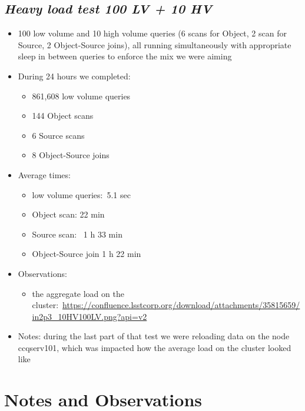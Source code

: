 \documentclass[DM,toc]{lsstdoc}
\begin{document}
\subsection{\texorpdfstring{\textbf{\emph{Heavy load test 100 LV + 10
HV}}}{Heavy load test 100 LV + 10 HV}}\label{heavy-load-test-100-lv-10-hv}

\begin{itemize}
\item
  100 low volume and 10 high volume queries (6 scans for Object, 2 scan
  for Source, 2 Object-Source joins), all running simultaneously with
  appropriate sleep in between queries to enforce the mix we were aiming
\item
  During 24 hours we completed:

  \begin{itemize}
  \item
    861,608 low volume queries
  \item
    144 Object scans
  \item
    6 Source scans
  \item
    8 Object-Source joins
  \end{itemize}
\item
  Average times:

  \begin{itemize}
  \item
    low volume queries:~5.1 sec
  \item
    Object scan: 22 min
  \item
    Source scan: ~1 h 33 min
  \item
    Object-Source join 1 h 22 min
  \end{itemize}
\item
  Observations:

  \begin{itemize}
  \item
    the aggregate load on the
    cluster:~\url{https://confluence.lsstcorp.org/download/attachments/35815659/in2p3_10HV100LV.png?api=v2}
  \end{itemize}
\item
  Notes: during the last part of that test we were reloading data on the
  node ccqserv101, which was impacted how the average load on the
  cluster looked like
\end{itemize}

\section{Notes and Observations}\label{notes-and-observations}
\end{document}
